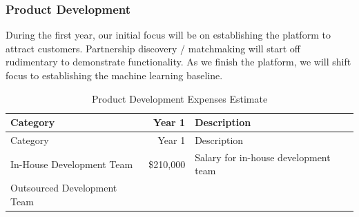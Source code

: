 \documentclass[10pt,openany]{book}
\begin{document}
\hypertarget{product-development}{%
\subsubsection{Product Development}\label{product-development}}

During the first year, our initial focus will be on establishing the
platform to attract customers. Partnership discovery / matchmaking will
start off rudimentary to demonstrate functionality. As we finish the
platform, we will shift focus to establishing the machine learning
baseline.

\begin{longtable}[]{@{}lrl@{}}
\caption{Product Development Expenses Estimate}\tabularnewline
\toprule
\begin{minipage}[b]{0.41\columnwidth}\raggedright
Category\strut
\end{minipage} & \begin{minipage}[b]{0.11\columnwidth}\raggedleft
Year 1\strut
\end{minipage} & \begin{minipage}[b]{0.39\columnwidth}\raggedright
Description\strut
\end{minipage}\tabularnewline
\midrule
\endfirsthead
\toprule
\begin{minipage}[b]{0.41\columnwidth}\raggedright
Category\strut
\end{minipage} & \begin{minipage}[b]{0.11\columnwidth}\raggedleft
Year 1\strut
\end{minipage} & \begin{minipage}[b]{0.39\columnwidth}\raggedright
Description\strut
\end{minipage}\tabularnewline
\midrule
\endhead
\begin{minipage}[t]{0.41\columnwidth}\raggedright
In-House Development Team\strut
\end{minipage} & \begin{minipage}[t]{0.11\columnwidth}\raggedleft
\$210,000\strut
\end{minipage} & \begin{minipage}[t]{0.39\columnwidth}\raggedright
Salary for in-house development team\strut
\end{minipage}\tabularnewline
\begin{minipage}[t]{0.41\columnwidth}\raggedright
Outsourced Development Team\strut
\end{minipage} & \begin{minipage}[t]{0.11\columnwidth}\raggedleft

\end{minipage}
\end{longtable}
\end{document}
